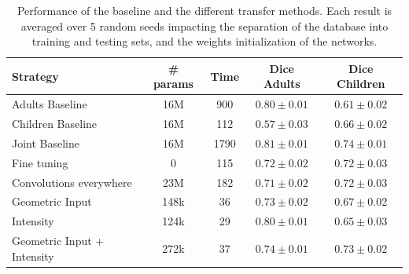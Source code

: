 \begin{table}[htb]
	\centering
\begin{tabular}{|l|c|c|c|c|}
	\hline
    Strategy & \# params & Time & Dice Adults & Dice Children \\
	\hline
    Adults Baseline & 16M & 900 & $\bm{0.80 \pm 0.01}$ & $0.61 \pm 0.02$ \\
    Children Baseline & 16M & 112 & $0.57 \pm 0.03$ & $\bm{0.66 \pm 0.02}$ \\
    Joint Baseline & 16M & 1790 & $\bm{0.81 \pm 0.01}$ & $\bm{0.74 \pm 0.01}$ \\
    \hline
    Fine tuning & 0 & 115 & $0.72 \pm 0.02$ & $0.72 \pm 0.03$ \\
    Convolutions everywhere & 23M & 182 & $0.71 \pm 0.02$ & $0.72 \pm 0.03$ \\
    Geometric Input & 148k & 36 & $0.73 \pm 0.02$ & $0.67 \pm 0.02$ \\
    Intensity & 124k & 29 & $0.80 \pm 0.01$ & $0.65 \pm 0.03$ \\
    Geometric Input + Intensity & 272k & 37 & $\bm{0.74 \pm 0.01}$ & $\bm{0.73 \pm 0.02}$ \\
    \hline
\end{tabular}
	\vspace{2mm}
	\caption{Performance of the baseline and the different transfer methods. Each result is averaged over 5 random seeds impacting the separation of the database into training and testing sets, and the weights initialization of the networks.}
    \label{table:results}
\end{table}

